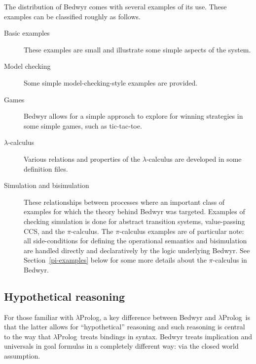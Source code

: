 \documentclass{article}
\newcommand{\lp}{$\lambda$Prolog}
\begin{document}
The distribution of Bedwyr comes with several examples of its use.
These examples can be classified roughly as follows.

\begin{description}
\item[Basic examples] These examples are small and illustrate some
  simple aspects of the system.

\item[Model checking] Some simple model-checking-style examples are
  provided. 

\item[Games] Bedwyr allows for a simple approach to explore for
  winning strategies in some simple games, such as tic-tac-toe.

\item[$\lambda$-calculus] Various relations and properties of the
  $\lambda$-calculus are developed in some definition files.

\item[Simulation and bisimulation] These relationships between
  processes where an important class of examples for which the theory
  behind Bedwyr was targeted.  Examples of checking simulation is done
  for abstract transition systems, value-passing CCS, and the
  $\pi$-calculus.  The $\pi$-calculus examples are of particular note:
  all side-conditions for defining the operational semantics and
  bisimulation are handled directly and declaratively by the logic
  underlying Bedwyr.  See Section~\ref{pi-examples} below for some more
  details about the $\pi$-calculus in Bedwyr.

\end{description}

\subsection{Hypothetical reasoning}

For those familiar with \lp, a key difference between
Bedwyr and \lp\ is that the latter allows for ``hypothetical''
reasoning and such reasoning is central to the way that \lp\ treats
bindings in syntax.    Bedwyr treats implication and universals in
goal formulas in a completely different way: via the closed world
assumption.  
\end{document}
